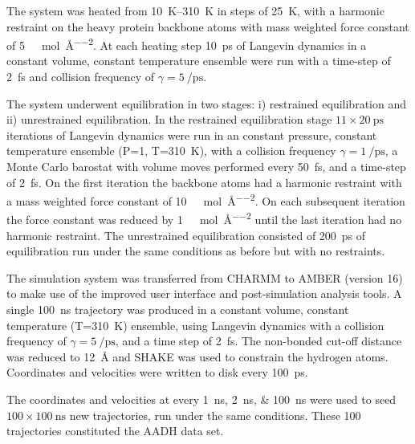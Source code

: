The system was heated from \SIrange{10}{310}{\kelvin} in steps of \SI{25}{\kelvin}, with a harmonic restraint on the heavy protein backbone atoms with mass weighted force constant of \SI{5}{\kilo\cal\per\mol\per\square\angstrom}. At each heating step \SI{10}{\pico\second} of Langevin dynamics\cite{ermakComputerSimulationCharged1974,ermakEquilibriumElectrostaticEffects1974} in a constant volume, constant temperature ensemble were run with a time-step of \SI{2}{\femto\second} and collision frequency of $\gamma=\SI{5}{\per\pico\second}$. 

The system underwent equilibration in two stages: i) restrained equilibration and ii) unrestrained equilibration. In the restrained equilibration stage $11 \times \SI{20}{\pico\second}$ iterations of Langevin dynamics were run in an constant pressure, constant temperature ensemble (P=\SI{1}{\atm}, T=\SI{310}{\kelvin}), with a collision frequency $\gamma=\SI{1}{\per\pico\second}$, a Monte Carlo barostat with volume moves performed every \SI{50}{\femto\second}, and a time-step of \SI{2}{\femto\second}. On the first iteration the backbone atoms had a harmonic restraint with a mass weighted force constant of  \SI{10}{\kilo\cal\per\mol\per\square\angstrom}. On each subsequent iteration the force constant was reduced by \SI{1}{\kilo\cal\per\mol\per\square\angstrom} until the last iteration had no harmonic restraint. The unrestrained equilibration consisted of \SI{200}{\pico\second} of equilibration run under the same conditions as before but with no restraints. 

The simulation system was transferred from CHARMM to AMBER (version 16)\cite{caseAMBER} to make use of the improved user interface and post-simulation analysis tools. A single  \SI{100}{\nano\second} trajectory was produced in a constant volume, constant temperature (T=\SI{310}{\kelvin}) ensemble, using Langevin dynamics with a collision frequency of $\gamma=\SI{5}{\per\pico\second}$, and a time step of \SI{2}{\femto\second}. The non-bonded cut-off distance was reduced to \SI{12}{\angstrom} and SHAKE\cite{ryckaertNumericalIntegrationCartesian1977b} was used to constrain the hydrogen atoms. Coordinates and velocities were written to disk every \SI{100}{\pico\second}.  

The coordinates and velocities at every \SIlist[list-final-separator = { ... }]{1; 2; 100}{\nano\second} were used to seed $100 \times \SI{100}{\nano\second}$ new trajectories, run under the same conditions. These \num{100} trajectories constituted the AADH data set. 

